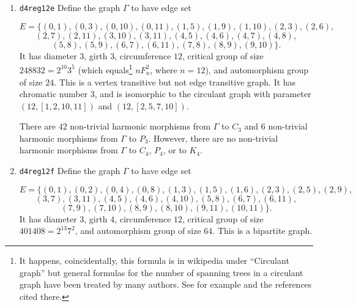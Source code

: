 \documentclass[12pt,letterpaper]{article}
\theoremstyle{definition}
\begin{document}
\begin{enumerate}
There are exactly $240$ non-trivial harmonic morphisms from $\Gamma$ to $C_3$,
$20$ non-trivial harmonic morphisms from $\Gamma$ to $P_3$,
$24$ non-trivial harmonic morphisms from $\Gamma$ to $C_4$,
but no non-trivial harmonic morphisms from $\Gamma$ to $P_4$ or to $K_4$.



\item
  
 {\tt d4reg12e}\newline
Define the graph $\Gamma$ to have edge set

\[
E = \{
(0, 1), (0, 3), (0, 10), (0, 11), (1, 5), (1, 9), (1, 10), (2, 3), (2, 6),
\]
\[
 (2, 7), (2, 11), (3, 10), (3, 11), (4, 5), (4, 6), (4, 7), (4, 8),
\]
\[
 (5, 8), (5, 9), (6, 7), (6, 11), (7, 8), (8, 9), (9, 10)
\}.
\]
It has diameter $3$,
girth $3$, circumference $12$,
critical group of size $248832 = 2^{10} 3^5$ (which
equals\footnote{It happens, coincidentally, this formula is in wikipedia
under ``Circulant graph'' but general formulas
for the number of spanning trees in a circulant graph have
been treated by many authors. See for example \cite{MM19} and the
references cited there.} $nF_n^2$, where $n=12$), 
and automorphism group of size $24$. This is a vertex transitive but not
edge transitive graph. It has chromatic number $3$, and is isomorphic to the circulant graph with parameter $(12, [1, 2, 10, 11])$ and
$(12, [2, 5, 7, 10])$.

There are $42$ non-trivial harmonic morphisms from $\Gamma$ to $C_3$
and $6$ non-trivial harmonic morphisms from $\Gamma$ to $P_3$.
However, there are no non-trivial harmonic morphisms from $\Gamma$ to $C_4$, $P_4$, or to $K_4$.  


\item
 {\tt d4reg12f}\newline
Define the graph $\Gamma$ to have edge set

\[
E = \{
(0, 1), (0, 2), (0, 4), (0, 8), (1, 3), (1, 5), (1, 6), (2, 3), (2, 5), (2, 9),
\]
\[
(3, 7), (3, 11), (4, 5), (4, 6), (4, 10), (5, 8), (6, 7), (6, 11), 
\]
\[
(7, 9), (7, 10), (8, 9), (8, 10), (9, 11), (10, 11)
\}.
\]
It has diameter $3$,
girth $4$, circumference $12$,
critical group of size $401408 = 2^{13} 7^2$, 
and automorphism group of size $64$. This is a bipartite graph.


\end{enumerate}
\end{document}
